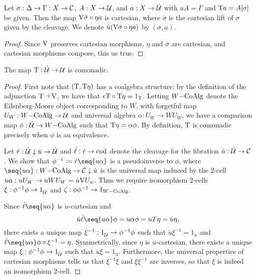 \documentclass[../thesis.tex]{subfiles}
\begin{document}
\begin{proposition}
  Let $\sigma : \Delta \to \Gamma : X \to {\mathcal{C}}$, $A : X \to {\mathcal{U}}$, and $a : X \to \dot{{\mathcal{U}}}$ with $uA = \Gamma$
  and ${{\mathrm{T}}} a = A[\sigma]$ be given. Then the map ${{\mathrm{V}}}\bar\sigma \circ \eta a$ is cartesian, where $\bar
  \sigma$ is the cartesian lift of $\sigma$ given by the cleavage. We denote $\dot u({{\mathrm{V}}}\bar\sigma \circ
  \eta a)$ by $(\sigma,a)$.
\end{proposition}
\begin{proof}
  Since ${{\mathrm{V}}}$ preserves cartesian morphisms, $\eta$ and $\bar\sigma$ are cartesian, and cartesian morphisms
  compose, this us true.
\end{proof}
\begin{proposition}
  The map ${{\mathrm{T}}} : \dot{{\mathcal{U}}} \to {\mathcal{U}}$ is comonadic.
\end{proposition}
\begin{proof}
  First note that $({{\mathrm{T}}}, {{\mathrm{T}}}\eta)$ has a coalgebra structure: by the definition of the adjunction ${{\mathrm{T}}} \dashv
  {{\mathrm{V}}}$, we have that $\epsilon{{\mathrm{T}}} \circ {{\mathrm{T}}}\eta = 1_{{\mathrm{T}}}$. Letting $W\mathrm{-CoAlg}$ denote the Eilenberg-Moore object
  corresponding to $W$, with forgetful map $U_W : W\mathrm{-CoAlg} \to {\mathcal{U}}$ and universal algebra $\alpha : U_W \to W U_W$,
  we have a comparison map $\phi : \dot{{\mathcal{U}}} \to W\mathrm{-CoAlg}$ such that ${{\mathrm{T}}}\eta = \alpha\phi$. By definition, ${{\mathrm{T}}}$
  is comonadic precisely when $\phi$ is an equivalence. 

  Let $\dot r : \dot{{\mathcal{U}}} \mathrel{\downarrow} \dot u \to \dot{{\mathcal{U}}}$ and $\dot \ell : \dot r \to {\mathrm{cod}}$ denote the cleavage for the
  fibration $\dot u : \dot{{\mathcal{U}}} \to {\mathcal{C}}$. We show that $\phi^{-1} \coloneq \dot r\seq{u\alpha}$ is a pseudoinverse
  to $\phi$, where $\seq{u\alpha} : W\CoAlg \to \cC \comma \dot u$ is the universal map induced by the 2-cell $u
  \alpha : uU_W \to uWU_W = \dot u {{\mathrm{V}}} U_w$. Thus we require isomorphism 2-cells $\xi : \phi^{-1} \phi \to 1_{
  \dot {{\mathcal{U}}}}$ and $\zeta : \phi\phi^{-1} \to 1_{W\mathrm{-CoAlg}}$.

  Since $\dot\ell\seq{u \alpha}$ is $\dot u$-cartesian and
  \[\dot u \dot\ell\seq{u\alpha}\phi = u\alpha\phi = u T\eta = \dot u \eta,\]
  there exists a unique map $\xi^{-1} : 1_{\dot{{\mathcal{U}}}} \to \phi^{-1}\phi$ such that $\dot u \xi^{-1} = 1_{\dot u}$
  and $\dot\ell\seq{u\alpha}\phi \circ \xi^{-1} = \eta$. Symmetrically, since $\eta$ is $\dot u$-cartesian, there
  exists a unique map $\xi : \phi^{-1}\phi \to 1_{\dot{{\mathcal{U}}}}$ such that $\dot u \xi = 1_{\dot u}$. Furthermore,
  the universal properties of cartesian morphisms tells us that $\xi^{-1}\xi$ and $\xi\xi^{-1}$ are inverses,
  so that $\xi$ is indeed an isomorphism 2-cell.

\end{proof}
\end{document}
